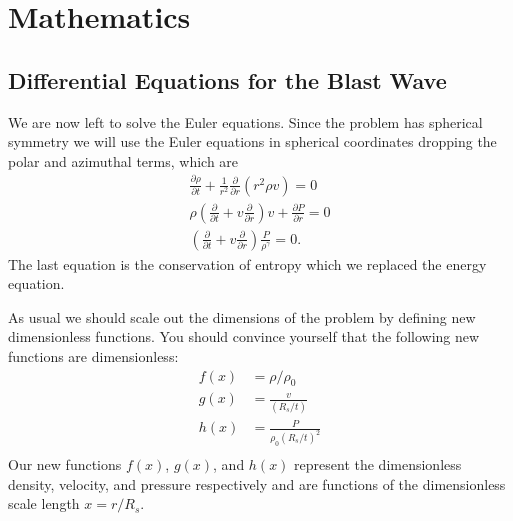 \documentclass{article}
\begin{document}
\section{Mathematics}
\subsection{Differential Equations for the Blast Wave}
We are now left to solve the Euler equations. Since the problem has spherical symmetry we will use the Euler equations in spherical coordinates dropping the polar and azimuthal terms, which are
\begin{gather}
\frac{\partial \rho}{\partial t} + \frac{1}{r^2}\frac{\partial}{\partial r}\left(r^2 \rho v\right) = 0\\
\rho\left(\frac{\partial}{\partial t} + v\frac{\partial}{\partial r}\right)v + \frac{\partial P}{\partial r} = 0\\
\left(\frac{\partial}{\partial t} + v\frac{\partial}{\partial r}\right) \frac{P}{\rho^\gamma} = 0.
\end{gather}
The last equation is the conservation of entropy which we replaced the energy equation.

As usual we should scale out the dimensions of the problem by defining new dimensionless functions. You should convince yourself that the following new functions are dimensionless:
\begin{align}
f(x) &= \rho/\rho_0\\
g(x) &= \frac{v}{(R_s/t)}\\
h(x) &= \frac{P}{\rho_0(R_s/t)^2}\\
\end{align}
Our new functions $f(x)$, $g(x)$, and $h(x)$ represent the dimensionless density, velocity, and pressure respectively and are functions of the dimensionless scale length $x=r/R_s$. 
\end{document}
